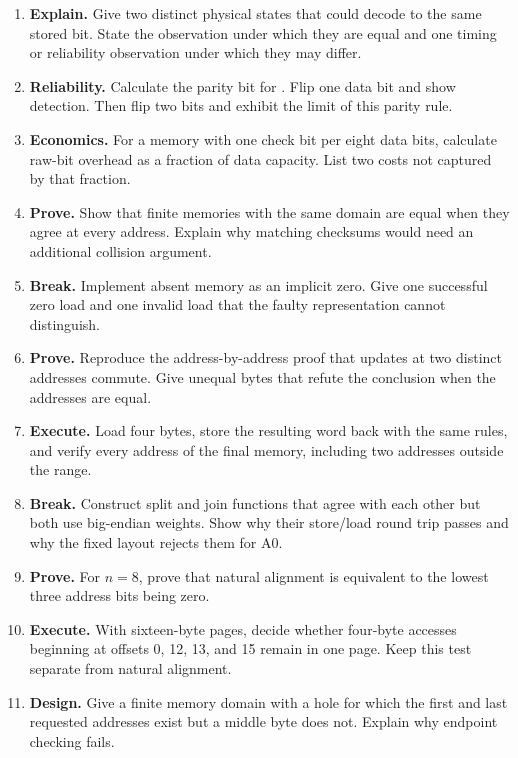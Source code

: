 \begin{enumerate}
bit line of the chapter's dynamic-cell miniature. State what writing, sensing,
leakage, and refresh do without claiming that one cell is one architectural
byte.
\item \textbf{Explain.} Give two distinct physical states that could decode to
the same stored bit. State the observation under which they are equal and one
timing or reliability observation under which they may differ.
\item \textbf{Reliability.} Calculate the parity bit for .
Flip one data bit and show detection. Then flip two bits and exhibit the limit
of this parity rule.
\item \textbf{Economics.} For a memory with one check bit per eight data bits,
calculate raw-bit overhead as a fraction of data capacity. List two costs not
captured by that fraction.
\item \textbf{Prove.} Show that finite memories with the same domain are equal
when they agree at every address. Explain why matching checksums would need an
additional collision argument.
\item \textbf{Break.} Implement absent memory as an implicit zero. Give one
successful zero load and one invalid load that the faulty representation
cannot distinguish.
\item \textbf{Prove.} Reproduce the address-by-address proof that updates at
two distinct addresses commute. Give unequal bytes that refute the conclusion
when the addresses are equal.
\item \textbf{Execute.} Load four bytes, store the resulting word back with
the same rules, and verify every address of the final memory, including two
addresses outside the range.
\item \textbf{Break.} Construct split and join functions that agree with each
other but both use big-endian weights. Show why their store/load round trip
passes and why the fixed layout  rejects them for A0.
\item \textbf{Prove.} For \(n=8\), prove that natural alignment is equivalent
to the lowest three address bits being zero.
\item \textbf{Execute.} With sixteen-byte pages, decide whether four-byte
accesses beginning at offsets 0, 12, 13, and 15 remain in one page. Keep this
test separate from natural alignment.
\item \textbf{Design.} Give a finite memory domain with a hole for which the
first and last requested addresses exist but a middle byte does not. Explain
why endpoint checking fails.

\end{enumerate}
